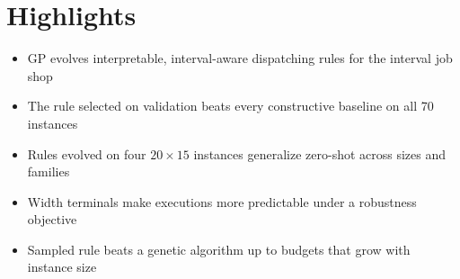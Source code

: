 \documentclass{article}
\begin{document}
\section*{Highlights}
\begin{itemize}
\item GP evolves interpretable, interval-aware dispatching rules for the
interval job shop
\item The rule selected on validation beats every constructive baseline on
all 70 instances
\item Rules evolved on four $20\times15$ instances generalize zero-shot
across sizes and families
\item Width terminals make executions more predictable under a robustness
objective
\item Sampled rule beats a genetic algorithm up to budgets that grow with
instance size
\end{itemize}
\end{document}
